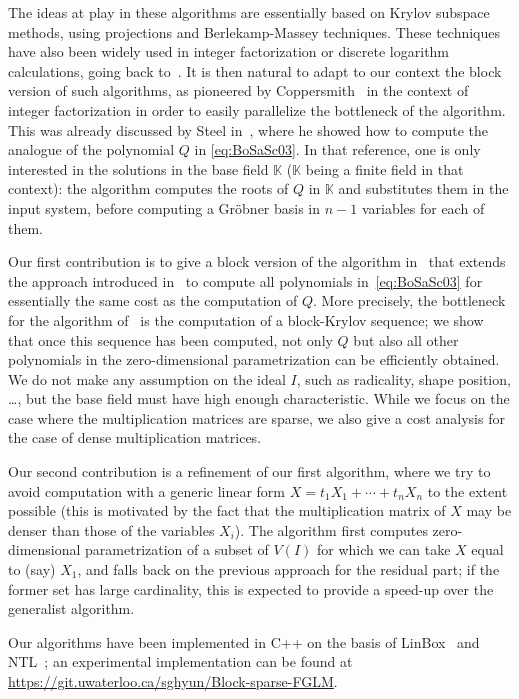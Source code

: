 \documentclass[12pt]{article}
\newcommand{\lf}{X}
\newcommand{\sqfree}{Q}
\def\K{\mathbb{K}}
\def\K {\ensuremath{\mathbb{K}}}
\begin{document}
The ideas at play in these algorithms are essentially based on Krylov
subspace methods, using projections and Berlekamp-Massey techniques.
These techniques have also been widely used in integer factorization
or discrete logarithm calculations, going back to~\cite{LaOd90}. It is
then natural to adapt to our context the block version of such
algorithms, as pioneered by Coppersmith~\cite{Coppersmith94} in the
context of integer factorization in order to easily parallelize the
bottleneck of the algorithm. This was already discussed by Steel
in~\cite{Steel15}, where he showed how to compute the analogue of the
polynomial $\sqfree$ in \cref{eq:BoSaSc03}. In that reference, one is
only interested in the solutions in the base field $\K$ ($\K$ being a
finite field in that context): the algorithm computes the roots of
$\sqfree$ in $\K$ and substitutes them in the input system, before
computing a Gr\"obner basis in $n-1$ variables for each of them.




Our first contribution is to give a block version of the algorithm
in~\cite{BoSaSc03} that extends the approach introduced
in~\cite{Steel15} to compute all polynomials in~\cref{eq:BoSaSc03} for
essentially the same cost as the computation of $\sqfree$. More
precisely, the bottleneck for the algorithm of~\cite{Steel15} is the
computation of a block-Krylov sequence; we show that once this
sequence has been computed, not only $\sqfree$ but also all other
polynomials in the zero-dimensional parametrization can be efficiently
obtained. We do not make any assumption on the ideal $I$, such as
radicality, shape position, \dots, but the base field must have high
enough characteristic. While we focus on the case where the
multiplication matrices are sparse, we also give a cost analysis
for the case of dense multiplication matrices.

Our second contribution is a refinement of our first algorithm, where
we try to avoid computation with a generic linear form $\lf =t_1 X_1 +
\cdots + t_n X_n$ to the extent possible (this is motivated by the
fact that the multiplication matrix of $\lf$ may be denser than those
of the variables $X_i$). The algorithm first computes zero-dimensional
parametrization of a subset of $V(I)$ for which we can take $\lf$
equal to (say) $X_1$, and falls back on the previous approach for the
residual part; if the former set has large cardinality, this is
expected to provide a speed-up over the generalist algorithm.

Our algorithms have been implemented in C++ on the basis of
LinBox~\cite{LinBox} and NTL~\cite{NTL}; an experimental
implementation can be found at
\url{https://git.uwaterloo.ca/sghyun/Block-sparse-FGLM}.
\end{document}
